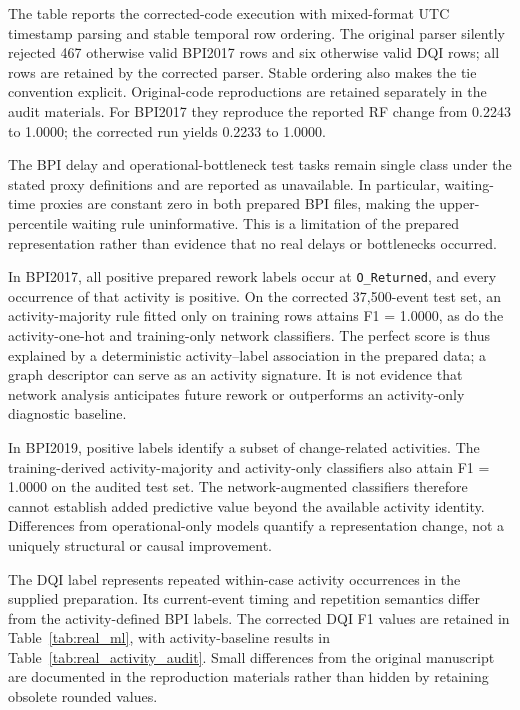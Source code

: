 The table reports the corrected-code execution with mixed-format UTC timestamp parsing and stable temporal row ordering. The original parser silently rejected 467 otherwise valid BPI2017 rows and six otherwise valid DQI rows; all rows are retained by the corrected parser. Stable ordering also makes the tie convention explicit. Original-code reproductions are retained separately in the audit materials. For BPI2017 they reproduce the reported RF change from 0.2243 to 1.0000; the corrected run yields 0.2233 to 1.0000.

The BPI delay and operational-bottleneck test tasks remain single class under the stated proxy definitions and are reported as unavailable. In particular, waiting-time proxies are constant zero in both prepared BPI files, making the upper-percentile waiting rule uninformative. This is a limitation of the prepared representation rather than evidence that no real delays or bottlenecks occurred.

In BPI2017, all positive prepared rework labels occur at \texttt{O\_Returned}, and every occurrence of that activity is positive. On the corrected 37,500-event test set, an activity-majority rule fitted only on training rows attains F1 = 1.0000, as do the activity-one-hot and training-only network classifiers. The perfect score is thus explained by a deterministic activity--label association in the prepared data; a graph descriptor can serve as an activity signature. It is not evidence that network analysis anticipates future rework or outperforms an activity-only diagnostic baseline.

In BPI2019, positive labels identify a subset of change-related activities. The training-derived activity-majority and activity-only classifiers also attain F1 = 1.0000 on the audited test set. The network-augmented classifiers therefore cannot establish added predictive value beyond the available activity identity. Differences from operational-only models quantify a representation change, not a uniquely structural or causal improvement.

The DQI label represents repeated within-case activity occurrences in the supplied preparation. Its current-event timing and repetition semantics differ from the activity-defined BPI labels. The corrected DQI F1 values are retained in Table~\ref{tab:real_ml}, with activity-baseline results in Table~\ref{tab:real_activity_audit}. Small differences from the original manuscript are documented in the reproduction materials rather than hidden by retaining obsolete rounded values.

